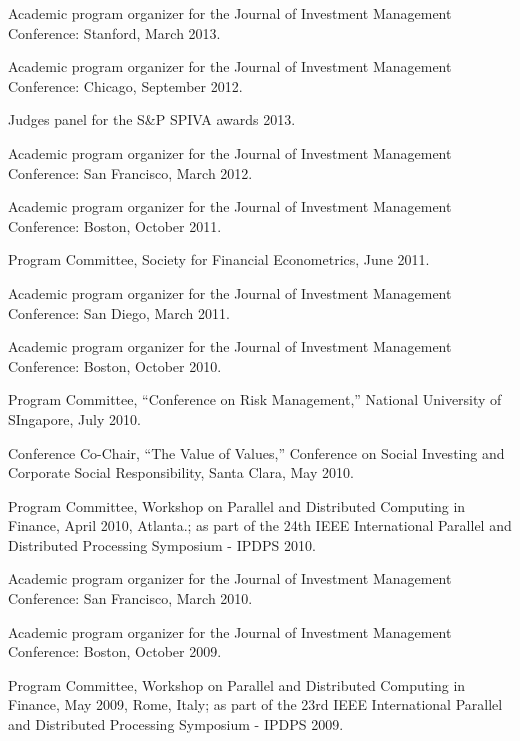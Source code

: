 \documentclass{article}
\begin{document}
\begin{description}
\begin{etaremune}
\item Academic program organizer for the Journal of Investment Management
Conference: Stanford, March 2013. 

\item Academic program organizer for the Journal of Investment Management
Conference: Chicago, September 2012. 

\item Judges panel for the S\&P SPIVA awards 2013. 

\item Academic program organizer for the Journal of Investment Management
Conference: San Francisco, March 2012. 

\item Academic program organizer for the Journal of Investment Management
Conference: Boston, October 2011. 

\item Program Committee, Society for Financial Econometrics, June 2011. 

\item Academic program organizer for the Journal of Investment Management
Conference: San Diego, March 2011. 

\item Academic program organizer for the Journal of Investment Management
Conference: Boston, October 2010. 

\item Program Committee, ``Conference on Risk Management,'' National University of SIngapore, July 2010. 

\item Conference Co-Chair, ``The Value of Values,'' Conference on Social Investing and Corporate Social Responsibility, Santa Clara, May 2010. 

\item Program Committee, Workshop on Parallel and Distributed Computing in Finance, April 2010, Atlanta.; as part of the 24th IEEE International Parallel and Distributed Processing Symposium - IPDPS 2010.

\item Academic program organizer for the Journal of Investment Management
Conference: San Francisco, March 2010.

\item Academic program organizer for the Journal of Investment Management
Conference: Boston, October 2009. 

\item Program Committee, Workshop on Parallel and Distributed Computing in Finance, May 2009, Rome, Italy; as part of the 23rd IEEE International Parallel and Distributed Processing Symposium - IPDPS 2009.


\end{etaremune}
\end{description}
\end{document}
